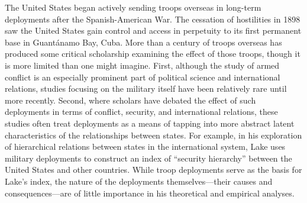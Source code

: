 The United States began actively sending troops overseas in long-term deployments after the Spanish-American War. The cessation of hostilities in 1898 saw the United States gain control and access in perpetuity to its first permanent base in Guant\'{a}namo Bay, Cuba. More than a century of troops overseas has produced some critical scholarship examining the effect of those troops, though it is more limited than one might imagine. First, although the study of armed conflict is an especially prominent part of political science and international relations, studies focusing on the military itself have been relatively rare until more recently. Second, where scholars have debated the effect of such deployments in terms of conflict, security, and international relations, these studies often treat deployments as a means of tapping into more abstract latent characteristics of the relationships between states.\autocite{Harkavy1989,Ikenberry2004,Lake2009a,Wohlforth1999,davis2011} For example, in his exploration of hierarchical relations between states in the international system, Lake uses military deployments to construct an index of ``security hierarchy'' between the United States and other countries. While troop deployments serve as the basis for Lake's index, the nature of the deployments themselves---their causes and consequences---are of little importance in his theoretical and empirical analyses.\autocite{Lake2009a} 

